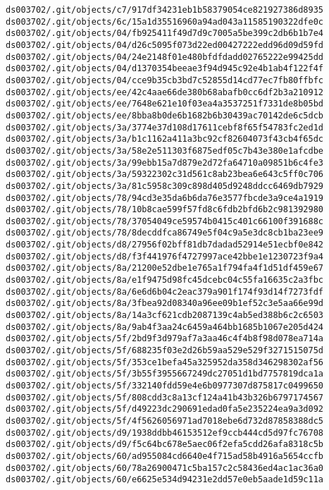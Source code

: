 \documentclass[11pt]{article}
\begin{document}
\begin{Verbatim}[commandchars=\\\{\}]
ds003702/.git/objects/c7/917df34231eb1b58379054ce821927386d8935
ds003702/.git/objects/6c/15a1d35516960a94ad043a11585190322dfe0c
ds003702/.git/objects/04/fb925411f49d7d9c7005a5be399c2db6b1b7e4
ds003702/.git/objects/04/d26c5095f073d22ed00427222edd96d09d59fd
ds003702/.git/objects/04/24e2148f01e480bfdfdadd02765222e99425dd
ds003702/.git/objects/04/d1370354beeae3f94d945c92e4b1ab4f122f4f
ds003702/.git/objects/04/cce9b35cb3bd7c52855d14cd77ec7fb80ffbfc
ds003702/.git/objects/ee/42c4aae66de380b68abafb0cc6df2b3a210912
ds003702/.git/objects/ee/7648e621e10f03ea4a3537251f7331de8b05bd
ds003702/.git/objects/ee/8bba8b0de6b1682b6b30439ac70142de6c5dcb
ds003702/.git/objects/3a/3774e37d108d17611cebf8f65f54783fc2ed1d
ds003702/.git/objects/3a/b1c1162a411a3bc92cf82604073f43cb4f65dc
ds003702/.git/objects/3a/58e2e511303f6875edf05c7b43e380e1afcdbe
ds003702/.git/objects/3a/99ebb15a7d879e2d72fa64710a09851b6c4fe3
ds003702/.git/objects/3a/59322302c31d561c8ab23bea6e643c5ff0c706
ds003702/.git/objects/3a/81c5958c309c898d405d9248ddcc6469db7929
ds003702/.git/objects/78/94cd3e35da6b6da76e3577fbcde3a9ce4a1919
ds003702/.git/objects/78/10b8cae599f57fd8c6fdb2bfd6b2c981392980
ds003702/.git/objects/78/37054049ce59574b0415c401c66100f391688c
ds003702/.git/objects/78/8decddfca86749e5f04c9a5e3dc8cb1ba23ee9
ds003702/.git/objects/d8/27956f02bff81db7dadad52914e51ecbf0e842
ds003702/.git/objects/d8/f3f441976f4727997ace42bbe1e1230723f9a4
ds003702/.git/objects/8a/21200e52dbe1e765a1f794fa4f1d51df459e67
ds003702/.git/objects/8a/e1f9475d98fc45dcebc04c55fa16635c2a3fbc
ds003702/.git/objects/8a/6e6d6b04c2eac379a901f174f93d14f7273fdf
ds003702/.git/objects/8a/3fbea92d08340a96ee09b1ef52c3e5aa66e99d
ds003702/.git/objects/8a/14a3cf621cdb2087139c4ab5ed388b6c2c6503
ds003702/.git/objects/8a/9ab4f3aa24c6459a464bb1685b1067e205d424
ds003702/.git/objects/5f/2bd9f3d979af7a3aa46c4f4b8f98d078ea714a
ds003702/.git/objects/5f/688235f03e2d26b59aa529e529f3271515075d
ds003702/.git/objects/5f/353ce1befa45a325952da358d346298302af56
ds003702/.git/objects/5f/3b55f3955667249dc27051d1bd7757819dca1a
ds003702/.git/objects/5f/332140fdd59e4e6b0977307d875817c0499650
ds003702/.git/objects/5f/808cdd3c8a13cf124a41b43b326b6797174567
ds003702/.git/objects/5f/d49223dc290691edad0fa5e235224ea9a3d092
ds003702/.git/objects/5f/4f5626056971ad7018ebe6d732d87858388dc5
ds003702/.git/objects/d9/1938ddbb46153512ef9ccb444cd5d97fc76708
ds003702/.git/objects/d9/f5c64bc678e5aec06f2efa5cdd26afa8318c5b
ds003702/.git/objects/60/ad955084cd6640e4f715ad58b4916a5654ccfb
ds003702/.git/objects/60/78a26900471c5ba157c2c58436ed4ac1ac36a0
ds003702/.git/objects/60/e6625e534d94231e2dd57e0eb5aade1d59c11a

\end{Verbatim}
\end{document}
